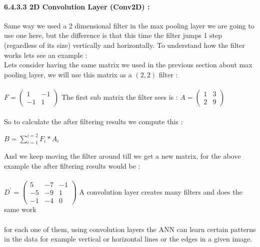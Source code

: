 \documentclass[10pt,a4paper]{article}
\begin{document}
\paragraph{6.4.3.3 2D Convolution Layer (Conv2D) :}
Same way we used a 2 dimensional filter in the max pooling layer we are going to use one here, but the difference is that this time the filter jumps 1 step (regardless of its size) vertically and horizontally. To understand how the filter works lets see an example :\\
Lets consider having the same matrix we used in the previous section about max pooling layer, we will use this matrix as a $ (2,2) $ filter :\\\\
$F = 
\begin{pmatrix}
1 & -1\\
-1 & 1
\end{pmatrix}
$
The first sub matrix the filter sees is : 
$A = 
\begin{pmatrix}
1 & 3\\
2 & 9
\end{pmatrix}
$\\\\
So to calculate the after filtering results we compute this :\\
\begin{center}
$ B = \sum_{i=1}^{i=2}F_i*A_i $
\end{center}
\newpage
And we keep moving the filter around till we get a new matrix, for the above example the after filtering results would be :\\\\
$D^{\prime} = 
\begin{pmatrix}
5 & -7 & -1\\
-5 & -9 & 1\\
-1 & -4 & 0
\end{pmatrix}
$
A convolution layer creates many filters and does the same work\\\\for each one of them, using convolution layers the ANN can learn certain patterns in the data for example vertical or horizontal lines or the edges in a given image.
\end{document}
